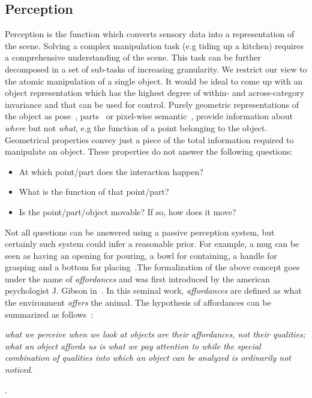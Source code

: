 \subsection{Perception}
Perception is the function which converts sensory data into a representation of the scene. Solving a complex manipulation task (e.g tiding up a kitchen) requires a comprehensive understanding of the scene. This task can be further decomposed in a set of sub-tasks of increasing granularity. We restrict our view to the atomic manipulation of a single object. It would be ideal to come up with an object representation which has the highest degree of within- and across-category invariance and that can be used for control. Purely geometric representations of the object as pose~\cite{xiang2017posecnn}, parts~\cite{li2020category} or pixel-wise semantic~\cite{jang2017end}, provide information about \emph{where} but not \emph{what}, e.g the function of a point belonging to the object. Geometrical properties convey just a piece of the total information required to manipulate an object. These properties do not answer the following questions:
\begin{itemize}
\item At which point/part does the interaction happen?
\item What is the function of that point/part?
\item Is the point/part/object movable? If so, how does it move?
\end{itemize}     
Not all questions can be answered using a passive perception system, but certainly such system could infer a reasonable prior. For example, a mug can be seen as having an opening for pouring, a bowl for containing, a handle for grasping and a bottom for placing~\cite{fagg1998modeling}.The formalization of the above concept goes under the name of \emph{affordances} and was first introduced by the american psychologist J. Gibson in~\cite{gibson1977theory}. In this seminal work, \emph{affordances} are defined as what the environment \emph{offers} the animal. The hypothesis of affordances can be summarized as follows~\cite{gibson1977theory}:
\begin{displayquote}
\emph{what we perceive when we look at objects are their affordances, not their qualities; what an object affords us is what we pay attention to while the special combination of qualities into which an object can be analyzed is ordinarily not noticed.} 
\end{displayquote}. 

